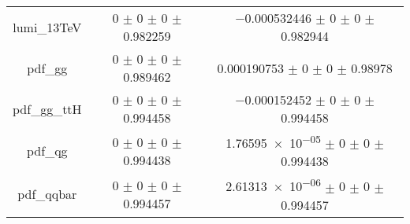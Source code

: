 \begin{table}
\begin{tabular}{ccc}
lumi\_13TeV & \num{0} $\pm$ \num{0} $\pm$ \num{0} $\pm$ \num{0.982259} & \num{-0.000532446} $\pm$ \num{0} $\pm$ \num{0} $\pm$ \num{0.982944}\\
pdf\_gg & \num{0} $\pm$ \num{0} $\pm$ \num{0} $\pm$ \num{0.989462} & \num{0.000190753} $\pm$ \num{0} $\pm$ \num{0} $\pm$ \num{0.98978}\\
pdf\_gg\_ttH & \num{0} $\pm$ \num{0} $\pm$ \num{0} $\pm$ \num{0.994458} & \num{-0.000152452} $\pm$ \num{0} $\pm$ \num{0} $\pm$ \num{0.994458}\\
pdf\_qg & \num{0} $\pm$ \num{0} $\pm$ \num{0} $\pm$ \num{0.994438} & \num{1.76595e-05} $\pm$ \num{0} $\pm$ \num{0} $\pm$ \num{0.994438}\\
pdf\_qqbar & \num{0} $\pm$ \num{0} $\pm$ \num{0} $\pm$ \num{0.994457} & \num{2.61313e-06} $\pm$ \num{0} $\pm$ \num{0} $\pm$ \num{0.994457}\\
\bottomrule
\end{tabular}
\end{table}